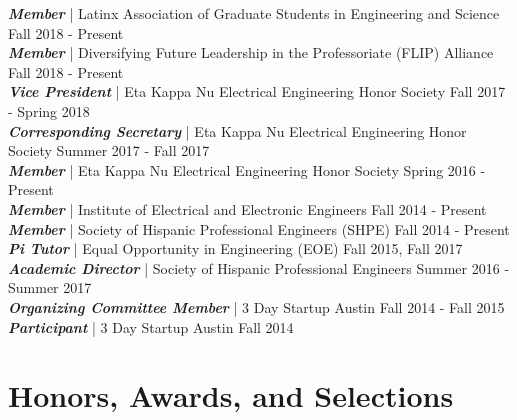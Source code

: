 \documentclass[line]{res}
\begin{document}
\begin{resume}
{\sl \textbf{Member}} | Latinx Association of Graduate Students in Engineering and Science \hfill Fall 2018 - Present
\\
{\sl \textbf{Member}} | Diversifying Future Leadership in the Professoriate (FLIP) Alliance \hfill Fall 2018 - Present
\\
{\sl \textbf{Vice President}} | Eta Kappa Nu Electrical Engineering Honor Society \hfill Fall 2017 - Spring 2018
\\
{\sl \textbf{Corresponding Secretary}} | Eta Kappa Nu Electrical Engineering Honor Society \hfill Summer 2017 - Fall 2017
\\
{\sl \textbf{Member}} | Eta Kappa Nu Electrical Engineering Honor Society \hfill Spring 2016 - Present
\\
{\sl \textbf{Member}} | Institute of Electrical and Electronic Engineers \hfill Fall 2014 - Present
\\
{\sl \textbf{Member}} | Society of Hispanic Professional Engineers (SHPE) \hfill Fall 2014 - Present
\\
{\sl \textbf{Pi Tutor}} | Equal Opportunity in Engineering (EOE) \hfill Fall 2015, Fall 2017
\\
{\sl \textbf{Academic Director}} | Society of Hispanic Professional Engineers \hfill Summer 2016 - Summer 2017
\\
{\sl \textbf{Organizing Committee Member}} | 3 Day Startup Austin \hfill Fall 2014 - Fall 2015
\\
{\sl \textbf{Participant}} | 3 Day Startup Austin \hfill Fall 2014

\newpage

\section{\Large{Honors, Awards, and Selections}}
\label{sec:honors}
\vspace{2mm}


\end{resume}
\end{document}
